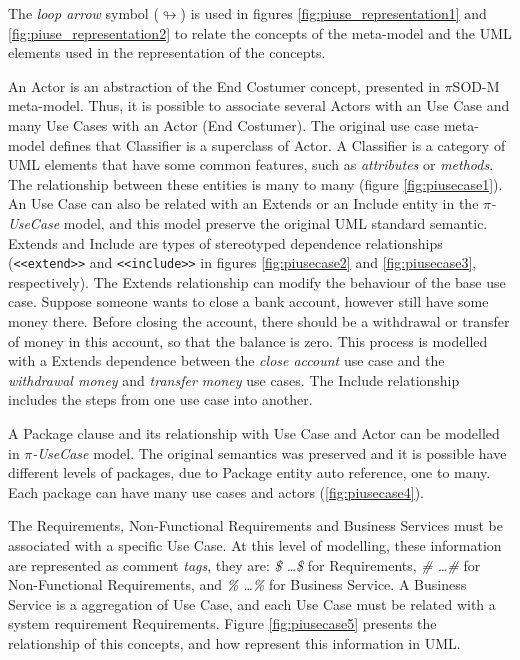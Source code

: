 The \textit{loop arrow} symbol ($\looparrowright$) is used in figures
\ref{fig:piuse_representation1} and \ref{fig:piuse_representation2} to
relate the concepts of the meta-model and the UML elements used in the
representation of the concepts.



An {\sc Actor} is an abstraction of the {\sc End
Costumer} concept, presented in $\pi$SOD-M meta-model. Thus, it is possible to
associate several {\sc Actors} with an {\sc Use Case} and many {\sc Use Cases} with an {\sc
Actor} ({\sc End Costumer}). The original use case meta-model defines
that {\sc Classifier} is a superclass of {\sc Actor}. A {\sc Classifier} is a
category of UML elements that have some common features, such as
\textit{attributes} or \textit{methods}. The relationship between these entities
is many to many (figure \ref{fig:piusecase1}). An  {\sc Use Case} can also be
related with an {\sc Extends} or an {\sc Include} entity in the \textit{$\pi$-UseCase} model, and
this model preserve the original UML standard semantic. {\sc
Extends} and {\sc Include} are types of stereotyped dependence relationships
(\texttt{<<extend>>} and \texttt{<<include>>} in figures \ref{fig:piusecase2}
and \ref{fig:piusecase3}, respectively). The {\sc Extends} relationship can modify the behaviour of the base use case. Suppose someone
wants to close a bank account, however still have some money there. Before
closing the account, there should be a withdrawal or transfer of money in this
account, so that the balance is zero. This process is modelled with a {\sc
Extends} dependence between the \textit{close account} use case and
the \textit{withdrawal money} and \textit{transfer money} use cases. The {\sc Include} relationship includes
the steps from one use case into another.

A {\sc Package} clause and its relationship with {\sc Use Case} and {\sc Actor}
 can be modelled in \textit{$\pi$-UseCase} model. The original semantics was
 preserved and it is possible have different levels of packages, due to  {\sc
 Package} entity auto reference, one to many. Each package can have many use
 cases and actors (\ref{fig:piusecase4}).

The {\sc Requirements}, {\sc Non-Functional Requirements} and {\sc Business
Services} must be associated with a specific {\sc Use Case}. At this level of modelling, these information are represented as
comment \textit{tags}, they are: \textit{\$ \ldots \$} for {\sc Requirements},
\textit{\# \ldots \#} for {\sc Non-Functional Requirements}, and \textit{\%
\ldots \%} for {\sc Business Service}. A {\sc
Business Service} is a aggregation of {\sc Use Case}, and each {\sc Use Case}
must be related with a system requirement {\sc Requirements}. Figure
\ref{fig:piusecase5} presents the relationship of this concepts, and how
represent this information in UML.

